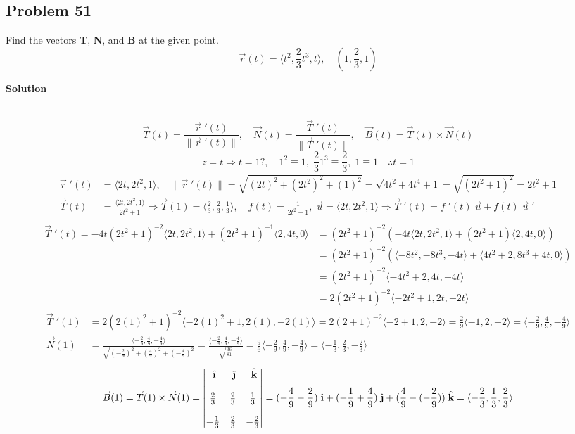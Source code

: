 \documentclass{article}
\newcommand{\ihat}{\;\hat{\textbf{\i}}}
\newcommand{\jhat}{\;\hat{\textbf{\j}}}
\newcommand{\khat}{\;\hat{\textbf{k}}}
\newcommand{\rvec}{\vec{r}(t)}
\newcommand{\drvec}{\vec{r}\;'(t)}
\newcommand\vv[1]{\langle #1 \rangle}
\newcommand\vc[2]{\vec{#1}(#2)}
\newcommand\vcd[2]{\vec{#1}\;'(#2)}
\newcommand\mgv[1]{\|#1\|}
\newcommand\mgvvv[3]{\sqrt{\left(#1\right)^2 + \left(#2\right)^2 + \left(#3\right)^2}}
\begin{document}
\subsection*{Problem 51}
Find the vectors \textbf{T}, \textbf{N}, and \textbf{B} at the given point.
\[
    \rvec = \langle{t^2, \frac{2}{3}t^3, t}\rangle, \quad (1, \frac{2}{3}, 1)
\]
\centerline{\textbf{Solution}} \\
\[
    \vc T t = \frac{\drvec}{\|\drvec\|}, \quad \vc N t = \frac{\vec T\;'(t)}{\|\vec T\;'(t)\|}, \quad \vc B t = \vc T t \times \vc N t
\]
\[
    z = t \Rightarrow t = 1?, \quad 1^2 \equiv 1,\; \frac 2 3 1^3 \equiv \frac 2 3,\; 1 \equiv 1 \quad \therefore t= 1
\]
\begin{align*}
    \vcd r t &= \vv{2t, 2t^2, 1}, \quad \mgv{\vcd r t} = \mgvvv{2t}{2t^2}{1} = \sqrt{4t^2 + 4t^4 + 1} = \sqrt{(2t^2 + 1)^2} = 2t^2 + 1 \\
    \vc T t &= \frac{\vv{2t, 2t^2, 1}}{2t^2+1} \Rightarrow \vc T 1 = \vv{\frac 2 3, \frac 2 3, \frac 1 3}, \quad f(t) = \frac{1}{2t^2 + 1}, \; \vec u = \vv{2t, 2t^2, 1} \Rightarrow \vcd T t = f\;'(t)\;\vec u + f(t)\;\vec u\;' \\
\end{align*}
\begin{align*}
    \vcd T t = -4t(2t^2+1)^{-2}\vv{2t,2t^2,1} + (2t^2+1)^{-1}\vv{2,4t,0} &= (2t^2+1)^{-2}(-4t\vv{2t, 2t^2, 1}+(2t^2+1)\vv{2,4t,0}) \\
             &= (2t^2+1)^{-2}(\vv{-8t^2,-8t^3,-4t}+\vv{4t^2+2,8t^3+4t,0}) \\
             &= (2t^2 + 1)^{-2}\vv{-4t^2 + 2, 4t, -4t} \\
             &= 2(2t^2+1)^{-2}\vv{-2t^2+1, 2t, -2t} 
\end{align*}
\begin{align*}
    \vcd T 1 &= 2(2(1)^2+1)^{-2}\vv{-2(1)^2+1, 2(1), -2(1)} = 2(2+1)^{-2}\vv{-2+1, 2, -2} = \frac 2 9 \vv{-1, 2, -2} = \vv{-\frac{2}{9}, \frac 4 9, -\frac 4 9} \\
    \vc N 1 &= \frac{\vv{-\frac 2 9, \frac 4 9, -\frac 4 9 }}{\mgvvv{-\frac 2 9}{\frac 4 9}{-\frac 4 9}} = \frac{\vv{-\frac 2 9, \frac 4 9, -\frac 4 9 }}{\sqrt{\frac{36}{81}}} = \frac 9 6\vv{-\frac 2 9, \frac 4 9, -\frac 4 9} = \vv{-\frac 1 3, \frac 2 3, -\frac 2 3}
\end{align*}
\begin{align*}
    \vc B 1 = \vc T 1 \times \vc N 1 =
    \begin{vmatrix}
        \ihat & \jhat & \khat \\ 
        \\
        \frac 2 3 & \frac 2 3 & \frac 1 3 \\ 
        \\
        -\frac 1 3 & \frac 2 3 & -\frac 2 3
    \end{vmatrix} = (-\frac 4 9 - \frac 2 9)\ihat + (-\frac 1 9 + \frac 4 9)\jhat + (\frac 4 9 - (-\frac 2 9))\khat = \vv{-\frac 2 3, \frac 1 3, \frac 2 3}
\end{align*}
\end{document}
